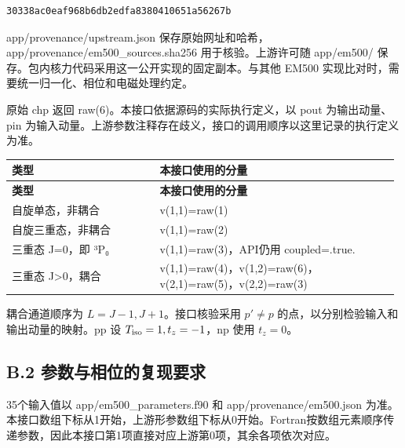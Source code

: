 \documentclass[UTF8,a4paper,zihao=5,fontset=fandol]{ctexart}
\begin{document}
\begin{Verbatim}[samepage=true,breaklines=true,breakanywhere=true,fontsize=\small,frame=leftline,framesep=3mm,rulecolor=\color{bluegray}]
30338ac0eaf968b6db2edfa8380410651a56267b
\end{Verbatim}
{\ttfamily\small app/\allowbreak{}provenance/\allowbreak{}upstream.\allowbreak{}json} 保存原始网址和哈希，{\ttfamily\small app/\allowbreak{}provenance/\allowbreak{}em500\_\allowbreak{}sources.\allowbreak{}sha256} 用于核验。上游许可随 {\ttfamily\small app/\allowbreak{}em500/\allowbreak{}} 保存。包内核力代码采用这一公开实现的固定副本。与其他 EM500 实现比对时，需要统一归一化、相位和电磁处理约定。

原始 {\ttfamily\small chp} 返回 {\ttfamily\small raw(6)}。本接口依据源码的实际执行定义，以 {\ttfamily\small pout} 为输出动量、{\ttfamily\small pin} 为输入动量。上游参数注释存在歧义，接口的调用顺序以这里记录的执行定义为准。


{\small\setlength{\tabcolsep}{3pt}\renewcommand{\arraystretch}{1.28}
\begin{longtable}{@{}>{\raggedright\arraybackslash}p{0.3705\linewidth}>{\raggedright\arraybackslash}p{0.6045\linewidth}@{}}\toprule
\textbf{类型} & \textbf{本接口使用的分量}\\\midrule
\endfirsthead
\textbf{类型} & \textbf{本接口使用的分量}\\\midrule
\endhead
自旋单态，非耦合 & {\ttfamily\small v(1,1)=\allowbreak{}raw(1)}\\
自旋三重态，非耦合 & {\ttfamily\small v(1,1)=\allowbreak{}raw(2)}\\
三重态 J=0，即 ³P₀ & {\ttfamily\small v(1,1)=\allowbreak{}raw(3)}，API仍用 {\ttfamily\small coupled=\allowbreak{}.\allowbreak{}true.\allowbreak{}}\\
三重态 J>0，耦合 & {\ttfamily\small v(1,1)=\allowbreak{}raw(4)}，{\ttfamily\small v(1,2)=\allowbreak{}raw(6)}，{\ttfamily\small v(2,1)=\allowbreak{}raw(5)}，{\ttfamily\small v(2,2)=\allowbreak{}raw(3)}\\
\bottomrule\end{longtable}}
耦合通道顺序为 \(L=J-1,J+1\)。接口核验采用 \(p'\ne p\) 的点，以分别检验输入和输出动量的映射。pp 设 \(T_{\rm iso}=1,t_z=-1\)，np 使用 \(t_z=0\)。

\subsection*{B.2 参数与相位的复现要求}
35个输入值以 {\ttfamily\small app/\allowbreak{}em500\_\allowbreak{}parameters.\allowbreak{}f90} 和 {\ttfamily\small app/\allowbreak{}provenance/\allowbreak{}em500.\allowbreak{}json} 为准。本接口数组下标从1开始，上游形参数组下标从0开始。Fortran按数组元素顺序传递参数，因此本接口第1项直接对应上游第0项，其余各项依次对应。
\end{document}
